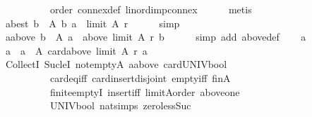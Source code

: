 \begin{isabellebody}
\ \ \ \ \ \ \ \ \ \ order\ connex{\isacharunderscore}{\kern0pt}def\ lin{\isacharunderscore}{\kern0pt}ord{\isacharunderscore}{\kern0pt}imp{\isacharunderscore}{\kern0pt}connex\isanewline
\ \ \ \ \isamarkupfalse%
\ metis\isanewline
\ \ \isamarkupfalse%
\ a{\isacharunderscore}{\kern0pt}best{\isacharcolon}{\kern0pt}\ {\isachardoublequoteopen}{\isasymforall}b\ {\isasymin}\ A{\isachardot}{\kern0pt}\ {\isacharparenleft}{\kern0pt}b{\isacharcomma}{\kern0pt}\ a{\isacharparenright}{\kern0pt}\ {\isasymin}\ limit\ A\ r{\isachardoublequoteclose}\isanewline
\ \ \ \ \isamarkupfalse%
\ simp\isanewline
\ \ \isamarkupfalse%
\ a{\isacharunderscore}{\kern0pt}above{\isacharcolon}{\kern0pt}\ {\isachardoublequoteopen}{\isasymforall}b\ {\isasymin}\ A{\isachardot}{\kern0pt}\ a\ {\isasymin}\ above\ {\isacharparenleft}{\kern0pt}limit\ A\ r{\isacharparenright}{\kern0pt}\ b{\isachardoublequoteclose}\isanewline
\ \ \ \ \isamarkupfalse%
\ {\isacharparenleft}{\kern0pt}simp\ add{\isacharcolon}{\kern0pt}\ above{\isacharunderscore}{\kern0pt}def{\isacharparenright}{\kern0pt}\isanewline
\ \ \isamarkupfalse%
\ a\ \isamarkupfalse%
\ {\isachardoublequoteopen}a\ {\isasymin}\ {\isacharbraceleft}{\kern0pt}a\ {\isasymin}\ A{\isachardot}{\kern0pt}\ card{\isacharparenleft}{\kern0pt}above\ {\isacharparenleft}{\kern0pt}limit\ A\ r{\isacharparenright}{\kern0pt}\ a{\isacharparenright}{\kern0pt}\ {\isasymle}\ {}{\isacharbraceright}{\kern0pt}{\isachardoublequoteclose}\isanewline
\ \ \ \ \isamarkupfalse%
\ CollectI\ Suc{\isacharunderscore}{\kern0pt}leI\ not{\isacharunderscore}{\kern0pt}empty{\isacharunderscore}{\kern0pt}A\ a{\isacharunderscore}{\kern0pt}above\ card{\isacharunderscore}{\kern0pt}UNIV{\isacharunderscore}{\kern0pt}bool\isanewline
\ \ \ \ \ \ \ \ \ \ card{\isacharunderscore}{\kern0pt}eq{\isacharunderscore}{\kern0pt}{}{\isacharunderscore}{\kern0pt}iff\ card{\isacharunderscore}{\kern0pt}insert{\isacharunderscore}{\kern0pt}disjoint\ empty{\isacharunderscore}{\kern0pt}iff\ finA\isanewline
\ \ \ \ \ \ \ \ \ \ finite{\isachardot}{\kern0pt}emptyI\ insert{\isacharunderscore}{\kern0pt}iff\ limitA{\isacharunderscore}{\kern0pt}order\ above{\isacharunderscore}{\kern0pt}one\isanewline
\ \ \ \ \ \ \ \ \ \ UNIV{\isacharunderscore}{\kern0pt}bool\ nat{\isachardot}{\kern0pt}simps{\isacharparenleft}{\kern0pt}{}{\isacharparenright}{\kern0pt}\ zero{\isacharunderscore}{\kern0pt}less{\isacharunderscore}{\kern0pt}Suc\isanewline
\ \ \ \ \isamarkupfalse%

\end{isabellebody}
